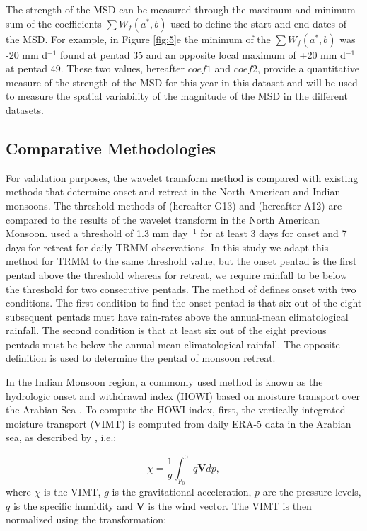 The strength of the MSD can be measured through the maximum and minimum sum of the coefficients $\sum W_f(a^*,b)$ used to define the start and end dates of the MSD.
For example, in Figure \ref{fig:5}e the minimum of the $\sum W_f(a^*,b)$ was -20 mm d$^{-1}$ found at pentad 35 and an opposite local maximum of +20 mm d$^{-1}$ at pentad 49. These two values, hereafter $coef1$ and $coef2$, provide a quantitative measure of the strength of the MSD for this year in this dataset and will be used to measure the spatial variability of the magnitude of the MSD in the different datasets.

\subsection{Comparative Methodologies}


For validation purposes, the wavelet transform method is compared with existing methods that determine onset and retreat in the North American and Indian monsoons. 
The threshold methods of \cite{geil2013} (hereafter G13) and \cite{arias2012} (hereafter A12) are compared to the results of the wavelet transform in the North American Monsoon.
 used a threshold of 1.3 mm day$^{-1}$ for at least 3 days for onset and 7 days for retreat for daily TRMM observations. In this study we adapt this method for TRMM to the same threshold value, but the onset pentad is the first pentad above the threshold whereas for retreat, we require rainfall to be below the threshold for two consecutive pentads.
 The method of  defines onset with two conditions. The first condition to find the onset pentad is that six out of the eight subsequent pentads must have rain-rates above the annual-mean climatological rainfall. The second condition is that at least six out of the eight previous pentads must be below the annual-mean climatological rainfall.
The opposite definition is used to determine the pentad of monsoon retreat. 

In the Indian Monsoon region, a commonly used method is known as the hydrologic onset and withdrawal index (HOWI)  based on moisture transport over the Arabian Sea \citep{fasullo2003,Sahana_2015,chevuturi2019}.
To compute the HOWI index, first, the vertically integrated moisture transport (VIMT) is computed from daily ERA-5 data in the Arabian sea, as described by \cite{fasullo2003}, i.e.:

\begin{equation}
\chi=\frac{1}{g}\int_{p_0}^0 q \mathbf{V} dp,
\end{equation}
 \noindent where $\chi$ is the VIMT, $g$ is the gravitational acceleration, $p$ are the pressure levels, $q$ is the specific humidity and $\mathbf{V}$ is the wind vector. The VIMT is then normalized using the transformation:

